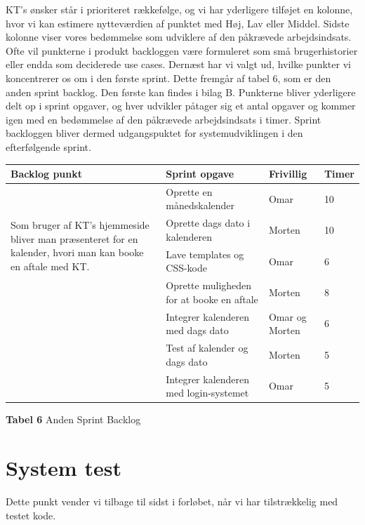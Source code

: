 \documentclass[12pt]{article}   %
\begin{document}
KT's ønsker står i prioriteret rækkefølge, og vi har yderligere tilføjet en kolonne, hvor vi kan estimere nytteværdien af punktet med Høj, Lav eller
Middel. Sidste kolonne viser vores bedømmelse som udviklere af den påkrævede arbejdsindsats. Ofte vil punkterne i produkt backloggen være formuleret som små brugerhistorier eller endda som deciderede use cases. Dernæst har vi valgt ud, hvilke punkter vi koncentrerer os om i den første sprint. Dette fremgår af tabel 6, som er den anden sprint backlog. Den første kan findes i bilag B. Punkterne bliver yderligere delt op i sprint opgaver, og hver udvikler påtager sig et antal opgaver og kommer igen med en bedømmelse af den påkrævede arbejdsindsats i timer. Sprint backloggen bliver dermed udgangspuktet for systemudviklingen i den efterfølgende sprint. 


\begin{center}
	\begin{tabular}{|l|p{4cm}|l|l|}
		\hline
		Backlog punkt & Sprint opgave & Frivillig & Timer\\ \hline
		\multirow{4}{4cm}{Som bruger af KT's hjemmeside bliver man præsenteret for en kalender, hvori man
		kan booke en aftale med KT.} & Oprette en månedskalender & Omar  & 10 \\
		& Oprette dags dato i kalenderen & Morten & 10 \\
		& Lave templates og CSS-kode & Omar & 6 \\
		& Oprette muligheden for at booke en aftale & Morten
		& 8 \\ 
		& Integrer kalenderen med dags dato & Omar og Morten & 6 \\
		& Test af kalender og dags dato & Morten & 5
		\\ & Integrer kalenderen med login-systemet & Omar & 5 \\
		\hline

	\end{tabular}
\end{center}

\begin{center}
\textbf{Tabel 6} Anden Sprint Backlog
\end{center}

\vspace{0.5cm}

\section{System test}
Dette punkt vender vi tilbage til sidst i forløbet, når vi har tilstrækkelig med testet kode.
\end{document}
